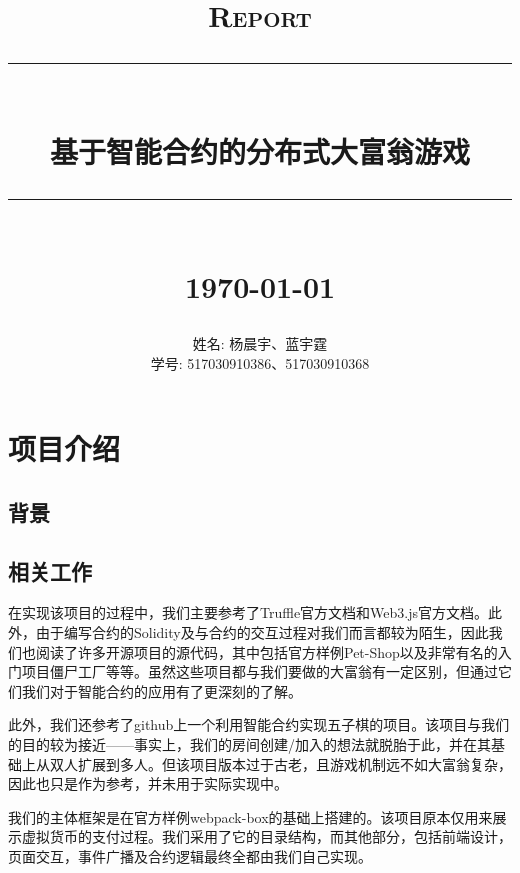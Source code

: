 \documentclass[12pt]{report}
\newcommand{\HRule}[1]{\rule{\linewidth}{#1}}
\begin{document}
\title{ \normalsize \textsc{Report}
        \\ [2.0cm]
        \HRule{0.5pt} \\
        \LARGE \textbf{\uppercase{基于智能合约的分布式大富翁游戏}}
        \HRule{2pt} \\ [0.5cm]
        \normalsize \today \vspace*{5\baselineskip}}

\date{}

\author{
        姓名: 杨晨宇、蓝宇霆 \\
        学号: 517030910386、517030910368 }


\maketitle
\tableofcontents
\newpage

\sectionfont{\scshape}


\section{项目介绍}
\subsection{背景}
\subsection{相关工作}
在实现该项目的过程中，我们主要参考了Truffle官方文档\cite{1}和Web3.js官方文档\cite{2}。此外，由于编写合约的Solidity及与合约的交互过程对我们而言都较为陌生，因此我们也阅读了许多开源项目的源代码，其中包括官方样例Pet-Shop\cite{3}以及非常有名的入门项目僵尸工厂\cite{4}等等。虽然这些项目都与我们要做的大富翁有一定区别，但通过它们我们对于智能合约的应用有了更深刻的了解。

此外，我们还参考了github上一个利用智能合约实现五子棋的项目\cite{5}。该项目与我们的目的较为接近——事实上，我们的房间创建/加入的想法就脱胎于此，并在其基础上从双人扩展到多人。但该项目版本过于古老，且游戏机制远不如大富翁复杂，因此也只是作为参考，并未用于实际实现中。

我们的主体框架是在官方样例webpack-box\cite{6}的基础上搭建的。该项目原本仅用来展示虚拟货币的支付过程。我们采用了它的目录结构，而其他部分，包括前端设计，页面交互，事件广播及合约逻辑最终全都由我们自己实现。
\end{document}
